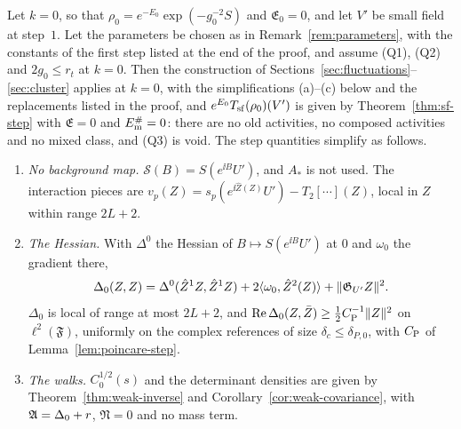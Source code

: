 \begin{proposition}\label{prop:first-step}
Let $k=0$, so that $\rho_0=e^{-E_0}\exp(-g_0^{-2}S)$ and $\mathfrak E_0=0$, and let $V'$ be small field at step~$1$. Let the parameters be chosen as in Remark~\ref{rem:parameters}, with the constants of the first step listed at the end of the proof, and assume (Q1), (Q2) and $2g_0\le r_t$ at $k=0$. Then the construction of Sections~\ref{sec:fluctuations}--\ref{sec:cluster} applies at $k=0$, with the simplifications (a)--(c) below and the replacements listed in the proof, and $e^{E_0}T_{\rm sf}(\rho_0)(V')$ is given by Theorem~\ref{thm:sf-step} with $\mathfrak E=0$ and $E^\#_{\rm m}=0$: there are no old activities, no composed activities and no mixed class, and (Q3) is void. The step quantities simplify as follows.
\begin{enumerate}[label=(\alph*)]
\item \emph{No background map.} $\mathcal S(B)=S(e^{\ii B}U')$, and $A_*$ is not used. The interaction pieces are $v_p(Z)=s_p(e^{\ii\hat Z(Z)}U')-T_2[\cdots](Z)$, local in $Z$ within range $2L+2$.
\item \emph{The Hessian.} With $\Delta^0$ the Hessian of $B\mapsto S(e^{\ii B}U')$ at $0$ and $\omega_0$ the gradient there,
\[
\Delta_0(Z,Z)=\Delta^0(\hat Z^1Z,\hat Z^1Z)+2\langle \omega_0,\hat Z^2(Z)\rangle+\|\mathfrak G_{U'}Z\|^2 .
\]
$\Delta_0$ is local of range at most $2L+2$, and $\operatorname{Re}\Delta_0(Z,\bar Z)\ge\frac12C_{\rm P}^{-1}\|Z\|^2$ on $\ell^2(\mathfrak F)$, uniformly on the complex references of size $\delta_c\le\delta_{P,0}$, with $C_{\rm P}$ of Lemma~\ref{lem:poincare-step}.
\item \emph{The walks.} $C_0^{1/2}(s)$ and the determinant densities are given by Theorem~\ref{thm:weak-inverse} and Corollary~\ref{cor:weak-covariance}, with $\mathfrak A=\Delta_0+r$, $\mathfrak N=0$ and no mass term.
\end{enumerate}
\end{proposition}

